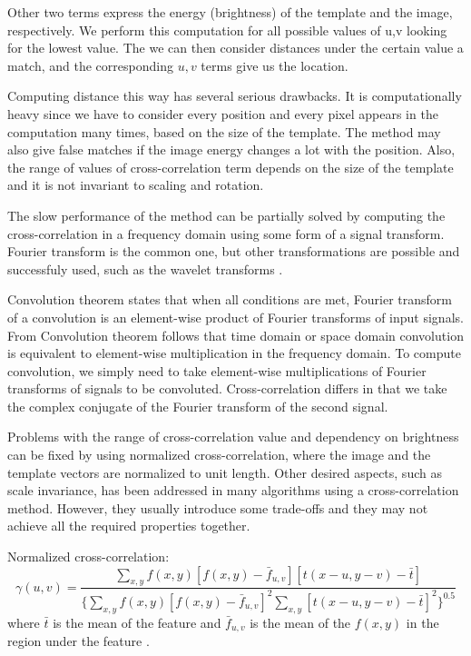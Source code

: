 Other two terms express the energy (brightness) of the template and the image, respectively. We perform this computation for all possible values of u,v looking for the lowest value. The we can then consider distances under the certain value a match, and the corresponding $u,v$ terms give us the location.

Computing distance this way has several serious drawbacks. It is computationally heavy since we have to consider every position and every pixel appears in the computation many times, based on the size of the template. The method may also give false matches if the image energy changes a lot with the position. Also, the range of values of cross-correlation term depends on the size of the template and it is not invariant to scaling and rotation. 

The slow performance of the method can be partially solved by computing the cross-correlation in a frequency domain using some form of a signal transform. Fourier transform is the common one, but other transformations are possible and successfuly used, such as the wavelet transforms \cite{patternRecNN}.

Convolution theorem states that when all conditions are met, Fourier transform of a convolution is an element-wise product of Fourier transforms of input signals. From Convolution theorem follows that time domain or space domain convolution is equivalent to element-wise multiplication in the frequency domain. To compute convolution, we simply need to take element-wise multiplications of Fourier transforms of signals to be convoluted. Cross-correlation differs in that we take the complex conjugate of the Fourier transform of the second signal. 

Problems with the range of cross-correlation value and dependency on brightness can be fixed by using normalized cross-correlation, where the image and the template vectors are normalized to unit length. Other desired aspects, such as scale invariance, has been addressed in many algorithms using a cross-correlation method. However, they usually introduce some trade-offs and they may not achieve all the required properties together. 

Normalized cross-correlation:
\begin{equation*}
\gamma(u,v) = \frac{\sum_{x,y}f(x,y) [f(x,y)-\bar{f}_{u,v}][t(x-u,y-v)-\bar{t}]} {\{ \sum_{x,y}f(x,y) [f(x,y)-\bar{f}_{u,v}]^2 \sum_{x,y}[t(x-u,y-v)-\bar{t}]^2\}^{0.5}}
\end{equation*}
where $\bar{t}$ is the mean of the feature and $\bar{f}_{u,v}$ is the mean of the $f(x,y)$ in the region under the feature \cite{crossCorrLewis}.

